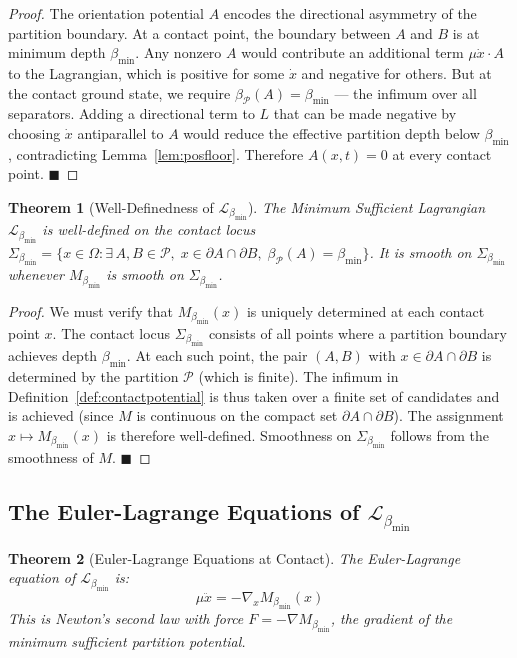 \documentclass[12pt, a4paper]{article}
\theoremstyle{plain}
\newtheorem{theorem}{Theorem}[section]
\theoremstyle{definition}
\theoremstyle{remark}
\newcommand{\bmin}{\beta_{\min}}
\newcommand{\Lmin}{\mathcal{L}_{\bmin}}
\newcommand{\Pcal}{\mathcal{P}}
\newcommand{\qed}{\hfill$\blacksquare$}
\begin{document}
\begin{proof}
The orientation potential $A$ encodes the directional asymmetry of the partition
boundary. At a contact point, the boundary between $A$ and $B$ is at minimum
depth $\bmin$. Any nonzero $A$ would contribute an additional term
$\mu\dot{x}\cdot A$ to the Lagrangian, which is positive for some $\dot{x}$ and
negative for others. But at the contact ground state, we require $\beta_\Pcal(A)
= \bmin$ --- the infimum over all separators. Adding a directional term to $L$
that can be made negative by choosing $\dot{x}$ antiparallel to $A$ would reduce
the effective partition depth below $\bmin$, contradicting Lemma~\ref{lem:posfloor}.
Therefore $A(x,t) = 0$ at every contact point. \qed
\end{proof}

\begin{theorem}[Well-Definedness of $\Lmin$]
\label{thm:welldefined}
The Minimum Sufficient Lagrangian $\Lmin$ is well-defined on the contact locus
$\Sigma_{\bmin} = \{x \in \Omega : \exists\, A,B \in \Pcal,\;x \in \partial A
\cap \partial B,\;\beta_\Pcal(A) = \bmin\}$. It is smooth on $\Sigma_{\bmin}$
whenever $M_{\bmin}$ is smooth on $\Sigma_{\bmin}$.
\end{theorem}

\begin{proof}
We must verify that $M_{\bmin}(x)$ is uniquely determined at each contact point
$x$. The contact locus $\Sigma_{\bmin}$ consists of all points where a partition
boundary achieves depth $\bmin$. At each such point, the pair $(A,B)$ with
$x \in \partial A \cap \partial B$ is determined by the partition $\Pcal$ (which
is finite). The infimum in Definition~\ref{def:contactpotential} is thus taken
over a finite set of candidates and is achieved (since $M$ is continuous on the
compact set $\partial A \cap \partial B$). The assignment $x \mapsto M_{\bmin}(x)$
is therefore well-defined. Smoothness on $\Sigma_{\bmin}$ follows from the
smoothness of $M$. \qed
\end{proof}

\subsection{The Euler-Lagrange Equations of $\Lmin$}

\begin{theorem}[Euler-Lagrange Equations at Contact]
\label{thm:el}
The Euler-Lagrange equation of $\Lmin$ is:
\[
  \mu\ddot{x} = -\nabla_x M_{\bmin}(x)
\]
This is Newton's second law with force $F = -\nabla M_{\bmin}$, the gradient of
the minimum sufficient partition potential.
\end{theorem}
\end{document}
